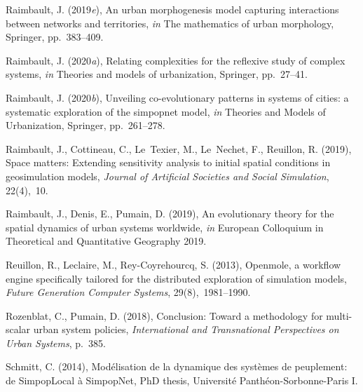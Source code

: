 \documentclass[11pt]{article}
\begin{document}
\begin{thebibliography}{xx}
Raimbault, J. (2019{\em e}), An urban morphogenesis model capturing
  interactions between networks and territories, {\em in} The mathematics of
  urban morphology, Springer, pp.~383--409.

Raimbault, J. (2020{\em a}), Relating complexities for the reflexive study of
  complex systems, {\em in} Theories and models of urbanization, Springer,
  pp.~27--41.

Raimbault, J. (2020{\em b}), Unveiling co-evolutionary patterns in systems of
  cities: a systematic exploration of the simpopnet model, {\em in} Theories
  and Models of Urbanization, Springer, pp.~261--278.

Raimbault, J., Cottineau, C., Le~Texier, M., Le~Nechet, F., Reuillon, R.
  (2019), Space matters: Extending sensitivity analysis to initial spatial
  conditions in geosimulation models, {\em Journal of Artificial Societies and
  Social Simulation}, 22(4),~10.
\newline{}

Raimbault, J., Denis, E., Pumain, D. (2019), An evolutionary theory for the
  spatial dynamics of urban systems worldwide, {\em in} European Colloquium in
  Theoretical and Quantitative Geography 2019.

Reuillon, R., Leclaire, M., Rey-Coyrehourcq, S. (2013), Openmole, a workflow
  engine specifically tailored for the distributed exploration of simulation
  models, {\em Future Generation Computer Systems}, 29(8),~1981--1990.

Rozenblat, C., Pumain, D. (2018), Conclusion: Toward a methodology for
  multi-scalar urban system policies, {\em International and Transnational
  Perspectives on Urban Systems}, p.~385.

Schmitt, C. (2014), Mod{\'e}lisation de la dynamique des syst{\`e}mes de
  peuplement: de SimpopLocal {\`a} SimpopNet, PhD thesis, Universit{\'e}
  Panth{\'e}on-Sorbonne-Paris I.


\end{thebibliography}
\end{document}

